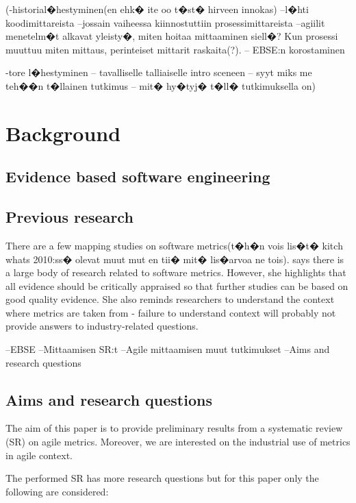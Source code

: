 \documentclass{sig-alternate}
\begin{document}
(-historial�hestyminen(en ehk� ite oo t�st� hirveen innokas)
--l�hti koodimittareista
--jossain vaiheessa kiinnostuttiin prosessimittareista
--agiilit menetelm�t alkavat yleisty�, miten hoitaa mittaaminen siell�? Kun
prosessi muuttuu miten mittaus, perinteiset mittarit raskaita(?).
-- EBSE:n korostaminen 

-tore l�hestyminen
-- tavalliselle talliaiselle intro sceneen
-- syyt miks me teh��n t�llainen tutkimus
-- mit� hy�tyj� t�ll� tutkimuksella on)



\section{Background}

\subsection{Evidence based software engineering}

\subsection{Previous research}

There are a few mapping studies on software metrics(t�h�n vois lis�t� kitch
whats 2010:ss� olevat muut mut en tii� mit� lis�arvoa ne tois).
\cite{kitchenham_whats_2010} says there is a large body of research related to
software metrics. However, she highlights that all evidence should be
critically appraised so that further studies can be based on good quality
evidence. She also reminds researchers to understand the context where metrics
are taken from - failure to understand context will probably not provide
answers to industry-related questions. 






--EBSE
--Mittaamisen SR:t
--Agile mittaamisen muut tutkimukset
--Aims and research questions




\subsection{Aims and research questions}
The aim of this paper is to provide preliminary results from a systematic
review (SR) on agile metrics. Moreover, we are interested on the
industrial use of metrics in agile context.

The performed SR has more research questions but for this paper only
the following are considered:
\end{document}
